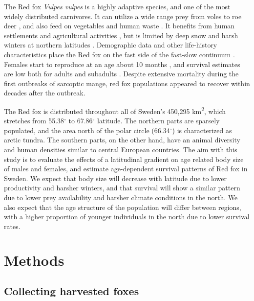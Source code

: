 \documentclass[12pt,a4paper,final,abstract=true,headings=small]{scrartcl}
\begin{document}
The Red fox \emph{Vulpes vulpes} is a highly adaptive species, and one of the most widely distributed carnivores. It can utilize a wide range prey from voles to roe deer \citep{englundAspectsReproductionMortality1970,kjellanderCyclicVolesPrey2003}, and also feed on vegetables and human waste \citep{carvalhoFoodHabitsTrophic2001}. It benefits from human settlements and agricultural activities \citep{jahrenImpactHumanLand2020,gallantDisentanglingRelativeInfluences2020,vuorisaloUrbanRedFoxes2014}, but is limited by deep snow and harsh winters at northern latitudes \citep{bartonWinterSeverityLimits2007,frafjordRedFoxNorway1998}. Demographic data and other life-history characteristics place the Red fox on the fast side of the fast-slow continuum \citep{heppellLifeHistoriesElasticity2000}. Females start to reproduce at an age about 10 months \citep{englundAspectsReproductionMortality1970}, and survival estimates are low both for adults and subadults \citep{devenish-nelsonDemographyCarnivoreRed2013, willebrandDecliningSurvivalRates2022}. Despite extensive mortality during the first outbreaks of sarcoptic mange, red fox populations appeared to recover within decades after the outbreak\citep{soulsburyImpactSarcopticMange2007,willebrandDecliningSurvivalRates2022}.

The Red fox is distributed throughout all of Sweden's 450,295 km\textsuperscript{2}, which stretches from 55.38$^{\circ}$ to 67.86$^{\circ}$ latitude.  The northern parts are sparsely populated, and the area north of the polar circle (66.34$^{\circ}$) is characterized as arctic tundra. The southern parts, on the other hand, have an animal  diversity and human densities similar to central European countries. The aim with this study is to evaluate the effects of a latitudinal gradient on age related body size of males and females, and estimate age-dependent survival patterns of Red fox in Sweden. We expect that body size will decrease with latitude due to lower productivity and harsher winters, and that survival will show a similar pattern due to lower prey availability and harsher climate conditions in the north. We also expect that the age structure of the population will differ between regions, with a higher proportion of younger individuals in the north due to lower survival rates.

\section*{Methods}

\subsection*{Collecting harvested foxes}
\end{document}
